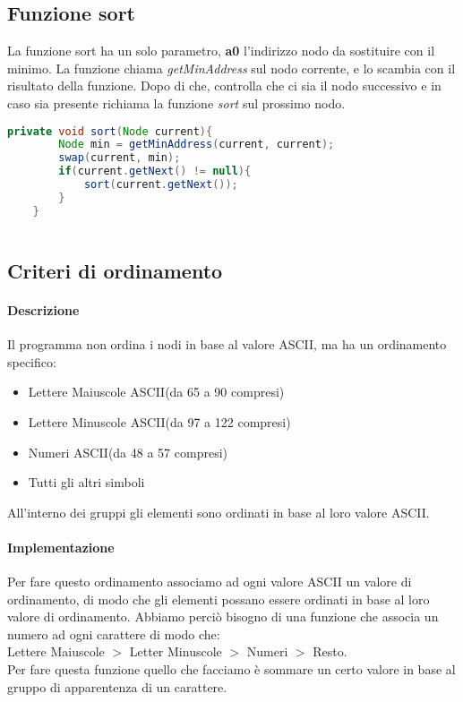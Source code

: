 \subsection{Funzione sort}
La funzione sort ha un solo parametro, \textbf{a0} l'indirizzo nodo da sostituire con il minimo.
La funzione chiama \textit{getMinAddress} sul nodo corrente, e lo scambia con il risultato della funzione.
Dopo di che, controlla che ci sia il nodo successivo e in caso sia presente richiama la funzione \textit{sort} sul prossimo nodo.
\\
\begin{lstlisting}[language=java,caption={Codice java algoritmo sort}, captionpos=b]
    private void sort(Node current){
        Node min = getMinAddress(current, current);
        swap(current, min);
        if(current.getNext() != null){
            sort(current.getNext());
        }
    }
    
\end{lstlisting}

\subsection{Criteri di ordinamento}
\paragraph{Descrizione}
Il programma non ordina i nodi in base al valore ASCII, ma ha un ordinamento specifico:
\begin{itemize}
    \item Lettere Maiuscole ASCII(da 65 a 90 compresi)
    \item Lettere Minuscole ASCII(da 97 a 122 compresi)
    \item Numeri ASCII(da 48 a 57 compresi)
    \item Tutti gli altri simboli
\end{itemize}
All'interno dei gruppi gli elementi sono ordinati in base al loro valore ASCII.

\paragraph{Implementazione}
Per fare questo ordinamento associamo ad ogni valore ASCII un valore di ordinamento, 
di modo che gli elementi possano essere ordinati in base al loro valore di ordinamento.
Abbiamo perciò bisogno di una funzione che associa un numero ad ogni carattere di modo che:\\
Lettere Maiuscole $>$ Letter Minuscole $>$ Numeri $>$ Resto.
\\
Per fare questa funzione quello che facciamo è sommare un certo valore in base al gruppo di apparentenza di un carattere.


